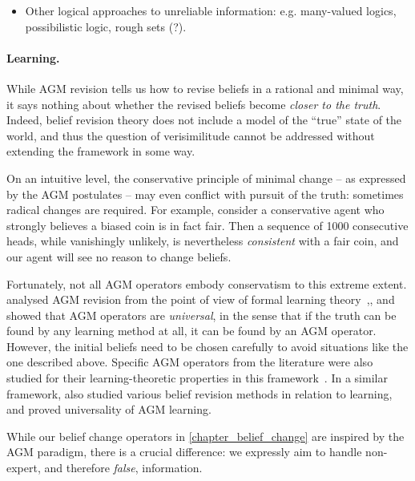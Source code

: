 {\begin{notes}
    \begin{itemize}
        \item Other logical approaches to unreliable information: e.g.
              many-valued logics, possibilistic logic, rough sets (?).
    \end{itemize}
\end{notes}

\paragraph{Learning.}

While AGM revision tells us how to revise beliefs in a rational and minimal
way, it says nothing about whether the revised beliefs become \emph{closer to
the truth}. Indeed, belief revision theory does not include a model of the
``true'' state of the world, and thus the question of verisimilitude cannot be
addressed without extending the framework in some way.

On an intuitive level, the conservative principle of minimal change -- as
expressed by the AGM postulates -- may even conflict with pursuit of the truth:
sometimes radical changes are required. For example, consider a conservative
agent who strongly believes a biased coin is in fact fair. Then a sequence of
1000 consecutive heads, while vanishingly unlikely, is nevertheless
\emph{consistent} with a fair coin, and our agent will see no reason to change
beliefs.

Fortunately, not all AGM operators embody conservatism to this extreme extent.
\textcite{kelly1997reliable} analysed AGM revision from the point of view of
formal learning
theory~\cite{jain1999systems},\cite[]{gierasimczuk2010knowing},
and showed that AGM operators are \emph{universal}, in the sense that if the
truth can be found by any learning method at all, it can be found by an AGM
operator. However, the initial beliefs need to be chosen carefully to avoid
situations like the one described above. Specific AGM operators from the
literature were also studied for their learning-theoretic properties in this
framework~\cite{kelly1998learning,Kelly_1999}. In a similar framework,
\textcite{gierasimczuk2010knowing,baltag_tt_2019,Baltag_2016} also studied
various belief revision methods in relation to learning, and proved
universality of AGM learning.

While our belief change operators in \cref{chapter_belief_change} are inspired
by the AGM paradigm, there is a crucial difference: we expressly aim to handle
non-expert, and therefore \emph{false}, information. 

}

